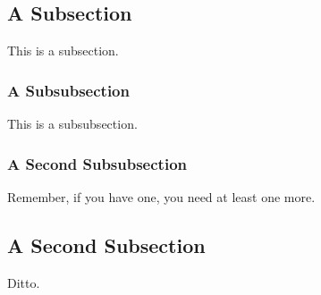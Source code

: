 \subsection{A Subsection}
\label{sec:latex-sec-sub}

This is a subsection.

\subsubsection{A Subsubsection}
\label{sec:latex-sec-subsub}

This is a subsubsection.

\subsubsection{A Second Subsubsection}
\label{sec:latex-sec-subsub2}

Remember, if you have one, you need at least one more.

\subsection{A Second Subsection}
\label{sec:latex-sub2}

Ditto.
